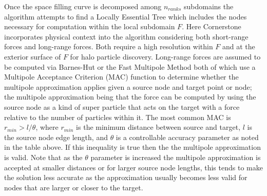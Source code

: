 Once the space filling curve is decomposed among $n_{ranks}$ subdomains the algorithm attempts to find a Locally Essential Tree which includes the nodes necessary for computation within the local subdomain $F$. Here Cornerstone ~\cite{cornerstone} incorporates physical context into the algorithm considering both short-range forces and long-range forces. Both require a high resolution within $F$ and at the exterior surface of $F$ for halo particle discovery. Long-range forces are assumed to be computed via Barnes-Hut or the Fast Multipole Method both of which use a Multipole Acceptance Criterion (MAC) function to determine whether the multipole approximation applies given a source node and target point or node; the multipole approximation being that the force can be computed by using the source node as a kind of super particle that acts on the target with a force relative to the number of particles within it. The most common MAC is $r_{min} > l/\theta$, where $r_{min}$ is the minimum distance between source and target, $l$ is the source node edge length, and $\theta$ is a controllable accuracy parameter as noted in the table above. If this inequality is true then the the multipole approximation is valid. Note that as the $\theta$ parameter is increased the multipole approximation is accepted at smaller distances or for larger source node lengths, this tends to make the solution less accurate as the approximation usually becomes less valid for nodes that are larger or closer to the target. 

